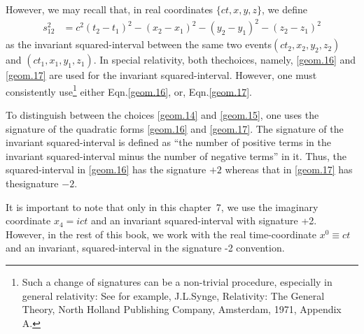 However, we may recall that, in real coordinates  
$\{ct,x,y,z\}$, we define
\begin{align}\label{geom.17}
s_{12}^2&=c^2(t_2 -t_1)^2 -(x_2-x_1)^2 -(y_2-y_1)^2 
-(z_2-z_1)^2
\end{align}
as the invariant squared-interval between the same two 
events\lbk $(ct_2,x_2,y_2,z_2)$ and 
$(ct_1,x_1,y_1,z_1)$. In special relativity, both 
the\lbk choices, namely, \eqref{geom.16} and 
\eqref{geom.17} are used for the invariant  
squa\break red-interval. However, one must consistently 
use\footnote{Such a change of signatures can be a 
non-trivial procedure, especially in general 
relativity: See for example, J.L.Synge, Relativity: 
The 
General Theory, North Holland Publishing Company, 
Amsterdam, 1971, Appendix A.} either  
Eqn.\break \eqref{geom.16}, or,  Eqn.\eqref{geom.17}.

To distinguish between the choices \eqref{geom.14} and 
\eqref{geom.15}, one uses the {signature}  of the 
quadratic forms  \eqref{geom.16} and \eqref{geom.17}. 
The signature  of the invariant squared-interval is 
defined as ``the number of positive terms in the 
invariant squared-interval {minus} the number of 
negative terms'' in it. Thus, the squared-interval in 
\eqref{geom.16} has the signature $+2$ whereas that in 
\eqref{geom.17} has thesignature $-2$.

It is important to note that only in this chapter~7,  
we  use the imaginary coordinate $ x_4=ict $ and an 
invariant squared-interval with signature +2. However, 
in the rest of this book, we work with the real 
time-coordinate $ x^0 \equiv ct $ and an invariant, 
squared-interval in the signature -2 convention.

